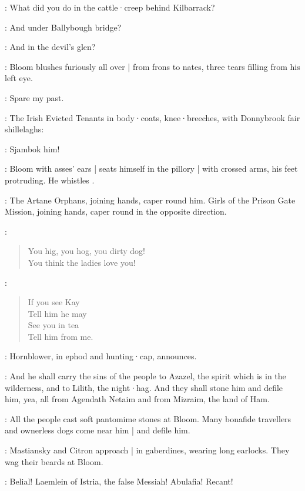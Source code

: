 
\Crab:
What did you do in the cattle·creep behind Kilbarrack?

\FemaleInfant:
And under Ballybough bridge?

\Hollybush:
And in the devil's glen?

:
Bloom blushes furiously all over |
from frons to nates,
three tears filling from his left eye.

\Bloom:
Spare my past.

:
The Irish Evicted Tenants in body·coats,
knee·breeches,
with Donnybrook fair shillelaghs:

\EvictedTenants:
Sjambok him!

:
Bloom with asses' ears |
seats himself in the pillory |
with crossed arms,
his feet protruding.
He whistles .

:
The Artane Orphans,
joining hands,
caper round him.
Girls of the Prison Gate Mission,
joining hands,
caper round in the opposite direction.

\ArtaneOrphans:
\begin{verse}
%
    You hig, you hog, you dirty dog!\\
    You think the ladies love you!
\end{verse}

\PrisonGateGirls[1]:
\begin{verse}
    If you see Kay\\
    Tell him he may\\
    See you in tea\\
    Tell him from me.
\end{verse}

:
Hornblower,
in ephod and hunting·cap,
announces.

\Hornblower:
And he shall carry the sins of the people to Azazel,
the spirit which is in the wilderness,
and to Lilith,
the night·hag.
And they shall stone him and defile him,
yea,
all from Agendath Netaim and from Mizraim,
the land of Ham.

:
All the people cast soft pantomime stones at Bloom.
Many bonafide travellers and ownerless dogs come near him |
and defile him.

:
Mastiansky and Citron approach |
in gaberdines,
wearing long earlocks.
They wag their beards at Bloom.

\MastianskyCitron:
Belial!
Laemlein of Istria,
the false Messiah!
Abulafia!
Recant!

